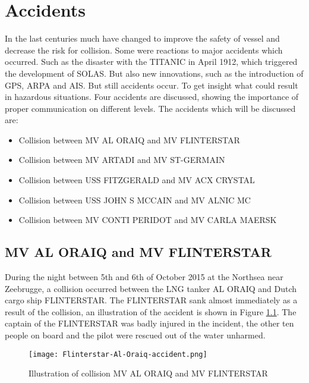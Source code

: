 \chapter{Accidents}
\label{app:accidents}
In the last centuries much have changed to improve the safety of vessel and decrease the risk for collision. Some were reactions to major accidents which occurred. Such as the disaster with the TITANIC in April 1912, which triggered the development of \ac{SOLAS}. But also new innovations, such as the introduction of \ac{GPS}, \ac{ARPA} and \ac{AIS}. But still accidents occur. To get insight what could result in hazardous situations. Four accidents are discussed, showing the importance of proper communication on different levels. The accidents which will be discussed are:
\begin{itemize}
	\item Collision between MV AL ORAIQ and MV FLINTERSTAR
	\item Collision between MV ARTADI and MV ST-GERMAIN
	\item Collision between USS FITZGERALD and MV ACX CRYSTAL
	\item Collision between USS JOHN S MCCAIN and MV ALNIC MC
	\item Collision between MV CONTI PERIDOT and MV CARLA MAERSK
\end{itemize}

\newpage
\section{MV AL ORAIQ and MV FLINTERSTAR}
\label{sec:al-oraiq-vs-flinterstar}
During the night between 5th and 6th of October 2015 at the Northsea near Zeebrugge, a collision occurred between the LNG tanker AL ORAIQ and Dutch cargo ship FLINTERSTAR. The FLINTERSTAR sank almost immediately as a result of the collision, an illustration of the accident is shown in Figure \ref{fig:Accident-Flinterstar-Al-Oraiq}. The captain of the FLINTERSTAR was badly injured in the incident, the other ten people on board and the pilot were rescued out of the water unharmed.

\begin{figure}[H]
	\centering
	\texttt{[image: Flinterstar-Al-Oraiq-accident.png]}
	\caption{Illustration of collision MV AL ORAIQ and MV FLINTERSTAR}
	\label{fig:Accident-Flinterstar-Al-Oraiq}
\end{figure}

